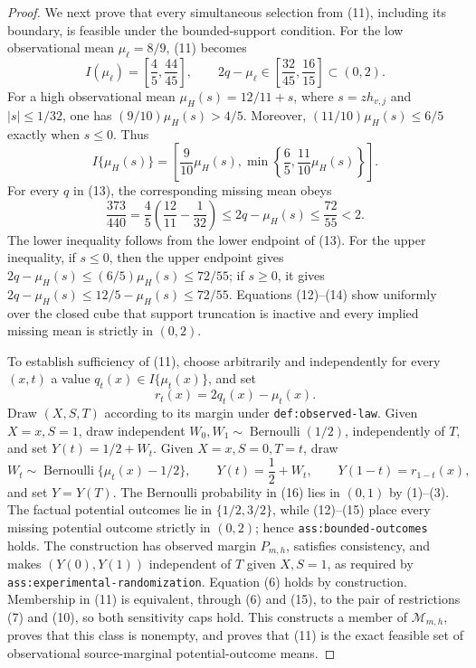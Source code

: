 \documentclass{article}
\begin{document}
\begin{proof}
We next prove that every simultaneous selection from (11), including
its boundary, is feasible under the bounded-support condition.  For the
low observational mean \(\mu_{\ell}=8/9\), (11) becomes
\[
 I(\mu_{\ell})=\left[\frac45,\frac{44}{45}\right],
 \qquad
 2q-\mu_{\ell}\in
 \left[\frac{32}{45},\frac{16}{15}\right]\subset(0,2).
 \tag{12}
\]
For a high observational mean
\(\mu_H(s)=12/11+s\), where \(s=z h_{v,j}\) and
\(|s|\leq1/32\), one has
\((9/10)\mu_H(s)>4/5\).  Moreover,
\((11/10)\mu_H(s)\leq6/5\) exactly when \(s\leq0\).
Thus
\[
 I\{\mu_H(s)\}
 =\left[
    \frac9{10}\mu_H(s),
    \min\left\{\frac65,\frac{11}{10}\mu_H(s)\right\}
   \right].
 \tag{13}
\]
For every \(q\) in (13), the corresponding missing mean obeys
\[
 \frac{373}{440}
 =\frac45\left(\frac{12}{11}-\frac1{32}\right)
 \leq 2q-\mu_H(s)\leq\frac{72}{55}<2.
 \tag{14}
\]
The lower inequality follows from the lower endpoint of (13).  For the
upper inequality, if \(s\leq0\), then the upper endpoint gives
\(2q-\mu_H(s)\leq(6/5)\mu_H(s)\leq72/55\); if
\(s\geq0\), it gives
\(2q-\mu_H(s)\leq12/5-\mu_H(s)\leq72/55\).
Equations (12)--(14) show uniformly over the closed cube that support
truncation is inactive and every implied missing mean is strictly in
\((0,2)\).

To establish sufficiency of (11), choose arbitrarily and independently
for every \((x,t)\) a value \(q_t(x)\in I\{\mu_t(x)\}\), and set
\[
 r_t(x)=2q_t(x)-\mu_t(x).
 \tag{15}
\]
Draw \((X,S,T)\) according to its margin under
\texttt{def:observed-law}.  Given \(X=x,S=1\), draw independent
\(W_0,W_1\sim\operatorname{Bernoulli}(1/2)\), independently of
\(T\), and set \(Y(t)=1/2+W_t\).  Given
\(X=x,S=0,T=t\), draw
\[
 W_t\sim\operatorname{Bernoulli}\{\mu_t(x)-1/2\},
 \qquad
 Y(t)=\frac12+W_t,
 \qquad
 Y(1-t)=r_{1-t}(x),
 \tag{16}
\]
and set \(Y=Y(T)\).  The Bernoulli probability in (16) lies in
\((0,1)\) by (1)--(3).  The factual potential outcomes lie in
\(\{1/2,3/2\}\), while (12)--(15) place every missing potential
outcome strictly in \((0,2)\); hence
\texttt{ass:bounded-outcomes} holds.  The construction has observed
margin \(P_{m,h}\), satisfies consistency, and makes
\((Y(0),Y(1))\) independent of \(T\) given \(X,S=1\), as required
by \texttt{ass:experimental-randomization}.  Equation (6) holds by
construction.  Membership in (11) is equivalent, through (6) and
(15), to the pair of restrictions (7) and (10), so both sensitivity
caps hold.  This constructs a member of \(\mathcal M_{m,h}\), proves
that this class is nonempty, and proves that (11) is the exact feasible
set of observational source-marginal potential-outcome means.


\end{proof}
\end{document}
